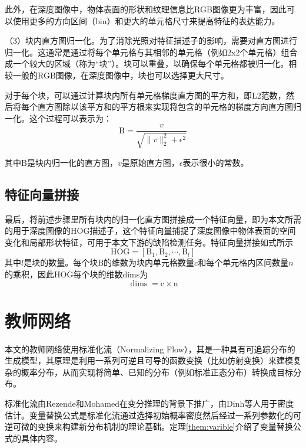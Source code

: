 此外，在深度图像中，物体表面的形状和纹理信息比RGB图像更为丰富，因此可以使用更多的方向区间（bin）和更大的单元格尺寸来提高特征的表达能力。

（3）块内直方图归一化。为了消除光照对特征描述子的影响，需要对直方图进行归一化。这通常是通过将每个单元格与其相邻的单元格（例如2x2个单元格）组合成一个较大的区域（称为“块”）。块可以重叠，以确保每个单元格都被归一化。相较一般的RGB图像，在深度图像中，块也可以选择更大尺寸。

对于每个块，可以通过计算块内所有单元格梯度直方图的平方和，即L2范数，然后将每个直方图除以该平方和的平方根来实现将包含的单元格的梯度方向直方图归一化。这个过程可以表示为：
\begin{equation}
	\mathrm{B}=\frac{v}{\sqrt{\|v\|_2^2+\epsilon^2}}
\end{equation}

其中$\mathrm{B}$是块内归一化的直方图，$v$是原始直方图，$\epsilon$表示很小的常数。


\subsection{特征向量拼接}
最后，将前述步骤里所有块内的归一化直方图拼接成一个特征向量，即为本文所需的用于深度图像的HOG描述子，这个特征向量捕捉了深度图像中物体表面的空间变化和局部形状特征，可用于本文下游的缺陷检测任务。特征向量拼接如式所示
\begin{equation}
	\mathrm{HOG}=\left [\mathrm{B}_{1}, \mathrm{B}_{2}, \cdots, \mathrm{B}_{l}\right ]
\end{equation}
其中$l$是块的数量。每个块$\mathrm{B}$的维数为块内单元格数量$c$和每个单元格内区间数量$n$的乘积，因此HOG每个块的维数dims为
\begin{equation}
	\operatorname{dims}=\mathrm{c} \times \mathrm{n}
\end{equation}



\section{教师网络}
本文的教师网络使用标准化流（Normalizing Flow），其是一种具有可追踪分布的生成模型，其原理是利用一系列可逆且可导的函数变换（比如仿射变换）来建模复杂的概率分布，从而实现将简单、已知的分布（例如标准正态分布）转换成目标分布。

标准化流由Rezende和Mohamed\cite{rezendeVariationalInferenceNormalizing2016}在变分推理的背景下推广，由Dinh等人\cite{dinhDensityEstimationUsing2017,lelanPerfectDensityModels2021}用于密度估计。变量替换公式是标准化流通过选择初始概率密度然后经过一系列参数化的可逆可微的变换来构建新分布机制的理论基础。定理\ref{them:varible}介绍了变量替换公式的具体内容。

